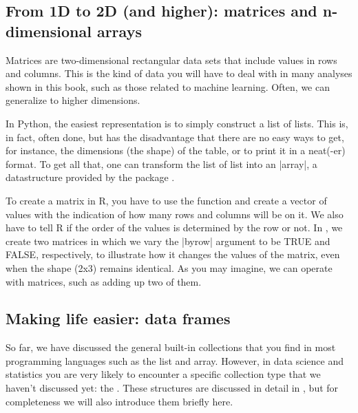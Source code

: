 \subsection{From 1D to 2D (and higher): matrices and n-dimensional arrays}

Matrices are two-dimensional rectangular data sets that include values
in rows and columns. This is the kind of data you will have to deal
with in many analyses shown in this book, such as those related to
machine learning. Often, we can generalize to higher dimensions.


In Python, the easiest representation is to simply construct a list of
lists. This is, in fact, often done, but has the disadvantage that
there are no easy ways to get, for instance, the dimensions (the
shape) of the table, or to print it in a neat(-er) format. To get all
that, one can transform the list of list into an |array|, a
datastructure provided by the package .

To create a matrix in R, you have to use the function  and
create a vector of values with the indication of how many rows and
columns will be on it. We also have to tell R if the order of the
values is determined by the row or not. In , we create
two matrices in which we vary the |byrow| argument to be TRUE and
FALSE, respectively, to illustrate how it changes the values of the
matrix, even when the shape (2x3) remains identical. As you may
imagine, we can operate with matrices, such as adding up two of them.



\subsection{Making life easier: data frames}

So far, we have discussed the general built-in collections that you find in most programming languages
such as the list and array.
However, in data science and statistics you are very likely to encounter a specific collection type that we haven't discussed yet: the .
These structures are discussed in detail in ,
but for completeness we will also introduce them briefly here. 


